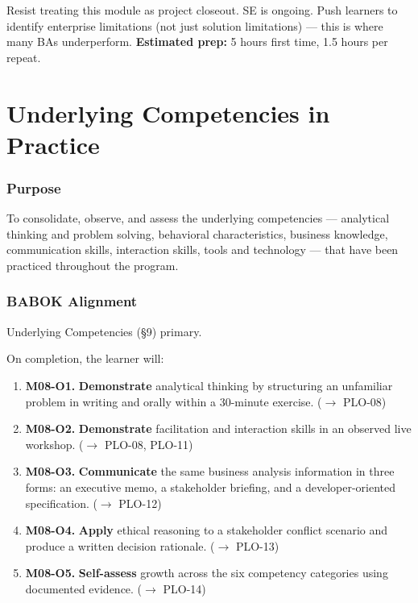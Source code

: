 \documentclass[11pt,letterpaper,oneside]{report}
\begin{document}
\begin{curriculumteachingnotes}
Resist treating this module as project closeout. SE is ongoing. Push learners to identify enterprise limitations (not just solution limitations) --- this is where many BAs underperform. \textbf{Estimated prep:} 5 hours first time, 1.5 hours per repeat.
\end{curriculumteachingnotes}

\chapter{Underlying Competencies in Practice}

\subsection*{Purpose}
To consolidate, observe, and assess the underlying competencies --- analytical thinking and problem solving, behavioral characteristics, business knowledge, communication skills, interaction skills, tools and technology --- that have been practiced throughout the program.

\subsection*{BABOK Alignment}
Underlying Competencies (\S9) primary.

\begin{outcomes}
On completion, the learner will:
\begin{enumerate}
  \item \textbf{M08-O1.} \textbf{Demonstrate} analytical thinking by structuring an unfamiliar problem in writing and orally within a 30-minute exercise. ($\to$ PLO-08)
  \item \textbf{M08-O2.} \textbf{Demonstrate} facilitation and interaction skills in an observed live workshop. ($\to$ PLO-08, PLO-11)
  \item \textbf{M08-O3.} \textbf{Communicate} the same business analysis information in three forms: an executive memo, a stakeholder briefing, and a developer-oriented specification. ($\to$ PLO-12)
  \item \textbf{M08-O4.} \textbf{Apply} ethical reasoning to a stakeholder conflict scenario and produce a written decision rationale. ($\to$ PLO-13)
  \item \textbf{M08-O5.} \textbf{Self-assess} growth across the six competency categories using documented evidence. ($\to$ PLO-14)
\end{enumerate}
\end{outcomes}
\end{document}
